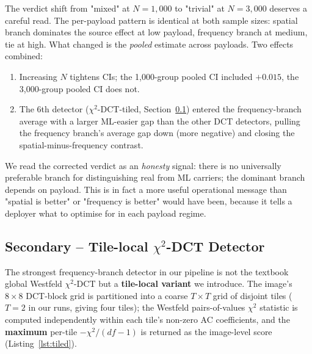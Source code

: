 \documentclass[10pt,twocolumn,a4paper]{article}
\begin{document}
The verdict shift from "mixed" at $N\!=\!1{,}000$ to "trivial" at $N\!=\!3{,}000$ deserves a careful read. The per-payload pattern is identical at both sample sizes: spatial branch dominates the source effect at low payload, frequency branch at medium, tie at high. What changed is the \emph{pooled} estimate across payloads. Two effects combined:
\begin{enumerate}
\item Increasing $N$ tightens CIs; the 1{,}000-group pooled CI included $+0.015$, the 3{,}000-group pooled CI does not.
\item The 6th detector ($\chi^2$-DCT-tiled, Section~\ref{sec:tiled}) entered the frequency-branch average with a larger ML-easier gap than the other DCT detectors, pulling the frequency branch's average gap down (more negative) and closing the spatial-minus-frequency contrast.
\end{enumerate}
We read the corrected verdict as an \emph{honesty} signal: there is no universally preferable branch for distinguishing real from ML carriers; the dominant branch depends on payload. This is in fact a more useful operational message than "spatial is better" or "frequency is better" would have been, because it tells a deployer what to optimise for in each payload regime.

\subsection{Secondary -- Tile-local $\chi^2$-DCT Detector}
\label{sec:tiled}

The strongest frequency-branch detector in our pipeline is not the textbook global Westfeld $\chi^2$-DCT but a \textbf{tile-local variant} we introduce. The image's $8\!\times\!8$ DCT-block grid is partitioned into a coarse $T\!\times\!T$ grid of disjoint tiles ($T\!=\!2$ in our runs, giving four tiles); the Westfeld pairs-of-values $\chi^2$ statistic is computed independently within each tile's non-zero AC coefficients, and the \textbf{maximum} per-tile $-\chi^2/(df\!-\!1)$ is returned as the image-level score (Listing~\ref{lst:tiled}).
\end{document}
